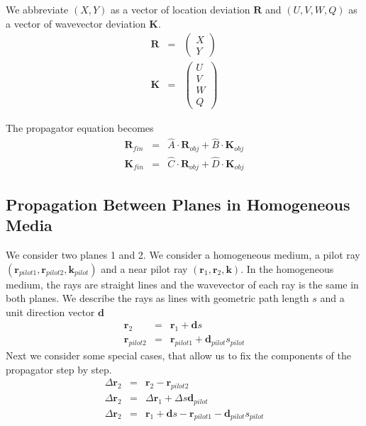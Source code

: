 \documentclass[12pt,a4paper,twoside,openright,BCOR10mm,headsepline,titlepage,abstracton,chapterprefix,final]{scrreprt}
\newcommand\Vector[1]{{\mathbf{#1}}}
\newcommand\wavenumber{k}
\newcommand\Wavevector{\Vector{\wavenumber}}
\begin{document}
We abbreviate $(X,Y)$ as a vector of location deviation $\Vector{R}$
and $(U,V,W,Q)$ as a vector of wavevector deviation $\Vector{K}$.
\begin{eqnarray}
\Vector{R} &=&
 \begin{pmatrix}
  X \\ Y
 \end{pmatrix}
 \\
 \Vector{K} &=&
 \begin{pmatrix}
  U \\ V \\ W \\ Q 
 \end{pmatrix}
\end{eqnarray}

The propagator equation becomes
\begin{eqnarray}
 \Vector{R}_{fin} &=& \hat{A} \cdot \Vector{R}_{obj} + \hat{B} \cdot \Vector{K}_{obj} \label{eq:xyuv_imaging_equation}\\
 \Vector{K}_{fin} &=& \hat{C} \cdot \Vector{R}_{obj} + \hat{D} \cdot \Vector{K}_{obj} 
\end{eqnarray}


\subsection{Propagation Between Planes in Homogeneous Media}
We consider two planes 1 and 2.
We consider a homogeneous medium, a pilot ray $( \Vector{r}_{pilot1}, \Vector{r}_{pilot2}, \Wavevector_{pilot} )$
and a near pilot ray $( \Vector{r}_{1}, \Vector{r}_{2}, \Wavevector )$. 
In the homogeneous medium, the rays are straight lines and the wavevector of each ray is the same in both planes.
We describe the rays as lines with geometric path length $s$ and a unit direction vector $\Vector{d}$
\begin{eqnarray}
 \Vector{r}_{2} &=& \Vector{r}_{1} + \Vector{d} s  \\
 \Vector{r}_{pilot2} &=& \Vector{r}_{pilot1} + \Vector{d}_{pilot} s_{pilot}
\end{eqnarray}
Next we consider some special cases, that allow us to fix the components of the propagator step by step.
\begin{eqnarray}
 \Delta \Vector{r}_2 &=& \Vector{r}_{2} - \Vector{r}_{pilot2} \\
 \Delta \Vector{r}_2 &=& \Delta \Vector{r}_1 + \Delta s \Vector{d}_{pilot} \\
 \Delta \Vector{r}_2 &=& \Vector{r}_{1} + \Vector{d} s  - \Vector{r}_{pilot1} - \Vector{d}_{pilot} s_{pilot}
\end{eqnarray}
\end{document}
